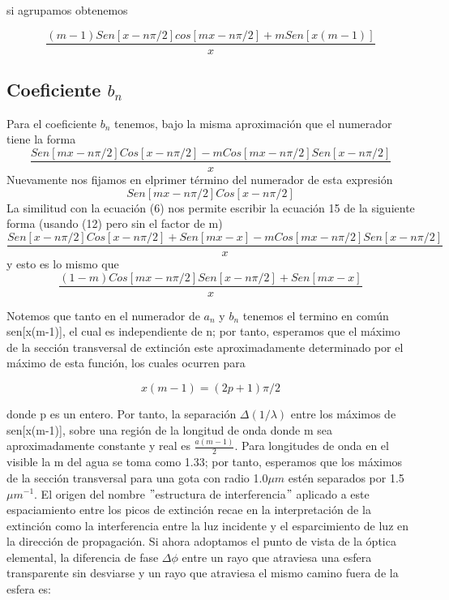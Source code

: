 \documentclass[11pt]{article}
\begin{document}
si agrupamos obtenemos 

\begin{equation}
    \frac{(m-1)Sen[x-n\pi/2]cos[mx-n\pi/2]+mSen[x(m-1)]}{x}
\end{equation}
\subsection*{Coeficiente $b_{n}$}
Para el coeficiente $b_{n}$ tenemos, bajo la misma aproximación que el numerador tiene la forma 
\begin{equation}
    \frac{Sen[mx-n\pi/2]Cos[x-n\pi/2]-mCos[mx-n\pi/2]Sen[x-n\pi/2]}{x}
\end{equation}
Nuevamente nos fijamos en elprimer término del numerador de esta expresión
\begin{equation}
   Sen[mx-n\pi/2]Cos[x-n\pi/2]
\end{equation}
La similitud con la ecuación (6) nos permite escribir la ecuación 15 de la siguiente forma (usando (12) pero sin el factor de m)
\begin{equation}
    \frac{Sen[x-n\pi/2]Cos[x-n\pi/2]+Sen[mx-x]-mCos[mx-n\pi/2]Sen[x-n\pi/2]}{x}
\end{equation}
y esto es lo mismo que
\begin{equation}
    \frac{(1-m)Cos[mx-n\pi/2]Sen[x-n\pi/2]+Sen[mx-x]}{x}
\end{equation}
























Notemos que tanto en el numerador de $a_{n}$ y $b_{n}$ tenemos el termino en común sen[x(m-1)], el cual es independiente de n; por tanto, esperamos que el máximo de la sección transversal de extinción este aproximadamente determinado por el máximo de esta función, los cuales ocurren para

\begin{equation}
    x(m-1)=(2p+1)\pi/2
\end{equation}

donde p es un entero. Por tanto, la separación $\Delta (1/\lambda)$ entre los máximos de sen[x(m-1)], sobre una región de la longitud de onda donde m sea aproximadamente constante y real es $\frac{a(m-1)}{2}$. Para longitudes de onda en el visible la m del agua se toma como 1.33; por tanto, esperamos que los máximos de la sección transversal para una gota con radio 1.0$\mu m$ estén separados por 1.5$\mu m^{-1}$. El origen del nombre $"$estructura de interferencia$"$ aplicado a este espaciamiento entre los picos de extinción recae en la interpretación de la extinción como la interferencia entre la luz incidente y el esparcimiento de luz en la dirección de propagación. Si ahora adoptamos el punto de vista de la óptica elemental, la diferencia de fase $\Delta \phi$ entre un rayo que atraviesa una esfera transparente sin desviarse y un rayo que atraviesa el mismo camino fuera de la esfera es:
\end{document}
